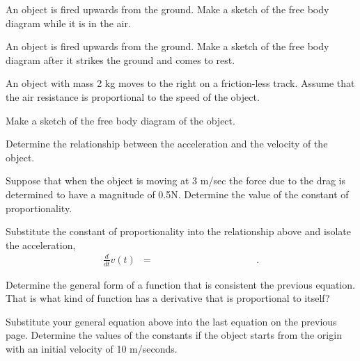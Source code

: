 
\begin{problem}
\item An object is fired upwards from the ground. Make a sketch of the
  free body diagram while it is in the air.
  \vfill

\item An object is fired upwards from the ground. Make a sketch of the
  free body diagram after it strikes the ground and comes to rest.
  \vfill

\end{problem}


\begin{problem}
\item An object with mass 2 kg moves to the right on a friction-less
  track. Assume that the air resistance is proportional to the speed
  of the object.

  \begin{subproblem}
  \item Make a sketch of the free body diagram of the object.
    \vfill
  \item Determine the relationship between the acceleration and the
    velocity of the object.
    \vfill
  \item Suppose that when the object is moving at 3 m/sec the force
    due to the drag is determined to have a magnitude of
    0.5N. Determine the value of the constant of proportionality.
    \vfill
  \item Substitute the constant of proportionality into the
    relationship above and isolate the acceleration,
    \begin{eqnarray*}
      \frac{d}{dt} v(t) & = & \hspace{10em}.
    \end{eqnarray*}
  \end{subproblem}

\clearpage

\item Determine the general form of a function that is consistent the
  previous equation. That is what kind of function has a derivative
  that is proportional to itself? 

  \vfill

\item Substitute your general equation above into the last equation on
  the previous page. Determine the values of the constants if the
  object starts from the origin with an initial velocity of 10
  m/seconds.

  \vfill

\clearpage

\end{problem}

